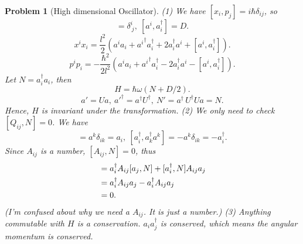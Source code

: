 \documentclass{article}
\theoremstyle{1}
\newtheorem{problem}{Problem}
\begin{document}
\begin{problem}[High dimensional Oscillator]
    (1) We have $[x_i,p_j]=i\hbar\delta_{ij}$, so
    \begin{equation}
        [a^i,a^\dagger_j]=\delta^i_{\ j},\ [a^i,a_i^\dagger]=D.
    \end{equation}
    \begin{equation}
        x^ix_i=\frac{l^2}{2}\left(a^ia_i+{a^i}^\dagger a_i^\dagger+2a_i^\dagger a^i+[a^i,a_i^\dagger]\right).
    \end{equation}
    \begin{equation}
        p^ip_i=-\frac{\hbar^2}{2l^2}\left(a^ia_i+{a^i}^\dagger a_i^\dagger-2a_i^\dagger a^i-[a^i,a_i^\dagger]\right).
    \end{equation}
    Let $N=a_i^\dagger a_i$, then 
    \begin{equation}
        \boxed{H=\hbar \omega (N+D/2).}
    \end{equation}
    \begin{equation}
        a'=Ua, \ a'^\dagger=a^\dagger U^\dagger,\ N'=a^\dagger \,U^\dagger U a=N.
    \end{equation}
    Hence, $H$ is invariant under the transformation.
\newline
(2) We only need to check $[Q_{ij},N]=0$. We have
\begin{equation}
    [a_i,a_k^\dagger a^k]=a^k\delta_{i k}=a_i,\  [a_i^\dagger,a_k^\dagger a^k]=-a^k\delta_{i k}=-a_i^\dagger.
\end{equation}
Since $A_{ij}$ is a number, $[A_{ij},N]=0$, thus 
\begin{align}
    [a_i^\dagger A_{ij}a_j,N]&=a_i^\dagger A_{ij} [ a_j,N]+[a_i^\dagger,N] A_{ij}a_j \notag\\
    &=a_i^\dagger A_{ij}a_j-a_i^\dagger A_{ij} a_j \notag\\
    &=0.
\end{align}
(I'm confused about why we need a $A_{ij}$. It is just a number.)
\newline
(3) Anything commutable with $H$ is a conservation. $a_ia_j^\dagger$ is conserved, which means the angular momentum is conserved.
\end{problem}
\end{document}
